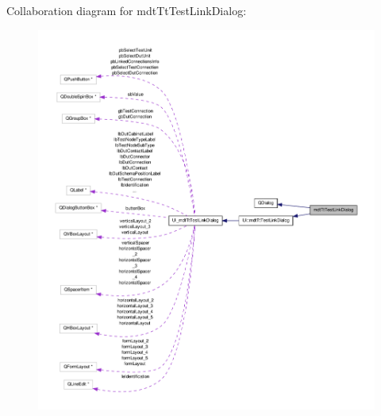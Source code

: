 Collaboration diagram for mdt\-Tt\-Test\-Link\-Dialog\-:
\nopagebreak
\begin{figure}[H]
\begin{center}
\leavevmode
\includegraphics[width=350pt]{classmdt_tt_test_link_dialog__coll__graph}
\end{center}
\end{figure}
